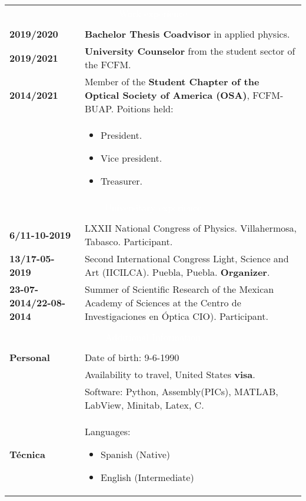 \documentclass[twoside,letter,openright,10pt]{report}
\begin{document}
\begin{table}[hbt!]
\begin{tabular}{p{40mm}p{140mm}}
\\
\multicolumn{2}{c}{\cellcolor{black} \textcolor{white}{Work experience}}
\\
\\
\textbf{2019/2020} & \textbf{Bachelor Thesis Coadvisor} in applied physics.
\\
\textbf{2019/2021} & \textbf{University Counselor} from the student sector of the FCFM.
\\
\textbf{2014/2021} & Member of the  \textbf{Student Chapter of the Optical Society of America (OSA)}, FCFM-BUAP. Poitions held:\\
& \vspace{-2mm} \begin{itemize}[noitemsep,nolistsep]
\item President.
\item Vice president.
\item Treasurer.
\vspace{-4mm}
\end{itemize}
\\
\multicolumn{2}{c}{\cellcolor{black} \textcolor{white}{Universitary experience}}
\\
\\
\textbf{6/11-10-2019} &LXXII National Congress of Physics. Villahermosa, Tabasco. Participant.
\\
\textbf{13/17-05-2019} &Second International Congress Light, Science and Art (IICILCA). Puebla, Puebla. \textbf{Organizer}.
\\
\textbf{23-07-2014/22-08-2014} & Summer of Scientific Research of the Mexican Academy of Sciences at the Centro de Investigaciones en Óptica CIO). Participant.
\\
\\
\multicolumn{2}{c}{\cellcolor{black} \textcolor{white}{ Additional Information}}
\\
\\
\textbf{Personal} &  Date of birth: 9-6-1990
\\
& Availability to travel, United States \textbf{visa}.
\\
& Software: Python, Assembly(PICs), MATLAB, LabView, Minitab, Latex, C.
\\
\textbf{Técnica}
& Languages:
\begin{itemize}[noitemsep,nolistsep]
\item Spanish (Native)
\item English (Intermediate)

\end{itemize}
\end{tabular}
\end{table}
\end{document}
